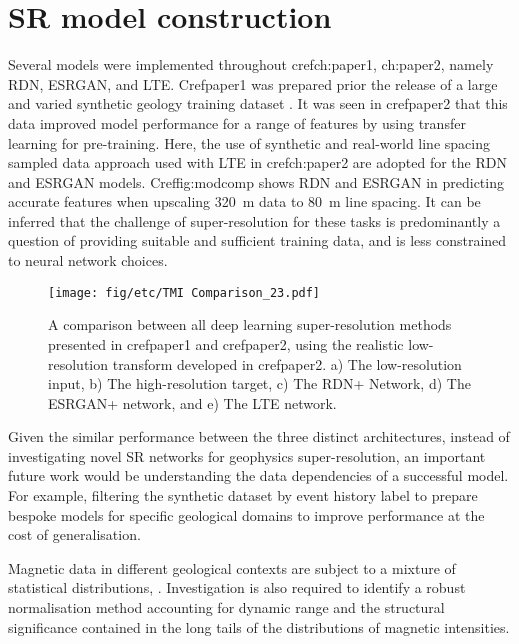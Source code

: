 \documentclass[manuscript.tex]{subfiles}
\begin{document}
\section{SR model construction}
Several models were implemented throughout cref{ch:paper1, ch:paper2}, namely RDN, ESRGAN, and LTE\@.
Cref{paper1} was prepared prior the release of a large and varied synthetic geology training dataset \parencite{jessellNoddyverseMassiveData2022}.
It was seen in cref{paper2} that this data improved model performance for a range of features by using transfer learning for pre-training.
Here, the use of synthetic and real-world line spacing sampled data approach used with LTE in cref{ch:paper2} are adopted for the RDN and ESRGAN models.
Cref{fig:modcomp} shows RDN and ESRGAN in predicting accurate features when upscaling \qty{320}{\m} data to \qty{80}{\m} line spacing.
It can be inferred that the challenge of super-resolution for these tasks is predominantly a question of providing suitable and sufficient training data, and is less constrained to neural network choices.

\begin{figure}
    \texttt{[image: fig/etc/TMI Comparison\_23.pdf]} %
    \caption{
        A comparison between all deep learning super-resolution methods presented in cref{paper1} and cref{paper2}, using the realistic low-resolution transform developed in cref{paper2}.
        a) The low-resolution input, b) The high-resolution target, c) The RDN+ Network, d) The ESRGAN+ network, and e) The LTE network.}
    \label{modcomp}
\end{figure}

Given the similar performance between the three distinct architectures, instead of investigating novel SR networks for geophysics super-resolution, an important future work would be understanding the data dependencies of a successful model. For example, filtering the synthetic dataset by event history label to prepare bespoke models for specific geological domains to improve performance at the cost of generalisation.

Magnetic data in different geological contexts are subject to a mixture of statistical distributions, \parencite{khokhlovCauseNonGaussianDistribution2017}. Investigation is also required to identify a robust normalisation method accounting for dynamic range and the structural significance contained in the long tails of the distributions of magnetic intensities.
\end{document}
